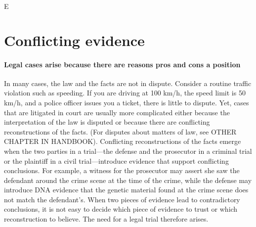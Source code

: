 \documentclass[10pt]{article}
\begin{document}
		E
			


\section{Conflicting evidence}

 	
\paragraph{Legal cases arise because there are reasons pros and cons a position} 


In many cases, the law and the facts are not in dispute. Consider a routine traffic violation such as speeding. 
If you are driving at 100 km/h, the speed limit is 50 km/h, and a police officer issues you a ticket, 
there is  little to dispute. Yet, cases that are litigated in court are usually more complicated either because the interpretation of 
the law is disputed or because there are conflicting reconstructions of the facts. 
(For disputes about matters of law, see OTHER CHAPTER IN HANDBOOK).
Conflicting reconstructions of the facts emerge when the two parties in a trial---the defense and the prosecutor in a criminal trial or 
the plaintiff in a civil trial---introduce evidence that support conflicting conclusions. 
For example, a witness for the prosecutor may assert she saw the defendant around the crime scene at the time of the crime, 
while the defense may introduce DNA evidence that the genetic material found at the crime scene does not match the defendant's.
When two pieces of evidence lead to contradictory conclusions, it is not easy 
to decide which piece of evidence to trust or which reconstruction to believe. The need for a legal trial therefore arises. 

\end{document}
